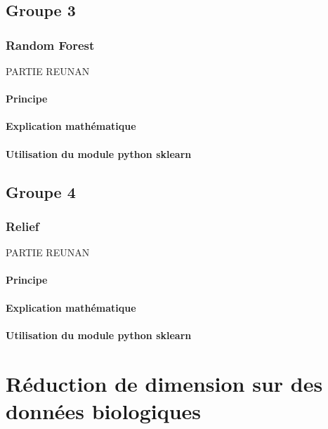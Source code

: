 \documentclass[12pt]{report}
\begin{document}
\section{Groupe 3}

\subsection{Random Forest}

PARTIE REUNAN

\subsubsection{Principe}

\subsubsection{Explication mathématique}

\subsubsection{Utilisation du module python sklearn}



\section{Groupe 4}

\subsection{Relief}

PARTIE REUNAN

\subsubsection{Principe}

\subsubsection{Explication mathématique}

\subsubsection{Utilisation du module python sklearn}


\chapter{Réduction de dimension sur des données biologiques}
\end{document}
